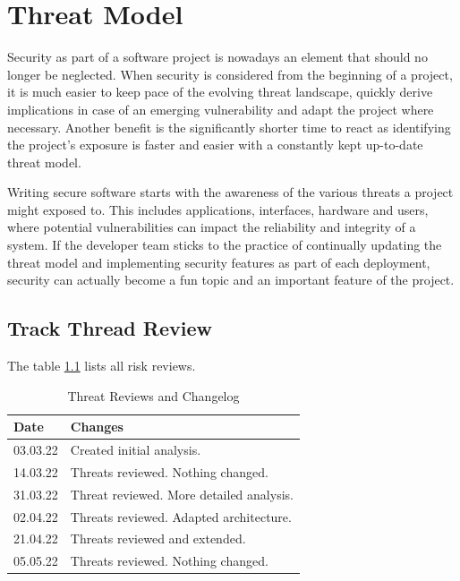 \chapter{Threat Model}

Security as part of a software project is nowadays an element that should no longer be neglected. When security is considered from the beginning of a project, it is much easier to keep pace of the evolving threat landscape, quickly derive implications in case of an emerging vulnerability and adapt the project where necessary. Another benefit is the significantly shorter time to react as identifying the project's exposure is faster and easier with a constantly kept up-to-date threat model.

Writing secure software starts with the awareness of the various threats a project might exposed to. This includes applications, interfaces, hardware and users, where potential vulnerabilities can impact the reliability and integrity of a system. If the developer team sticks to the practice of continually updating the threat model and implementing security features as part of each deployment, security can actually become a fun topic and an important feature of the project.

\section{Track Thread Review}
The table \ref{tab:threat-review} lists all risk reviews.

\begin{table}[h!]
  \centering
  \caption{\label{tab:threat-review}Threat Reviews and Changelog}
  \begin{tabular}{ | l | l | }
    \hline
    \textbf{Date} & \textbf{Changes} \\
    \hline
    03.03.22 & Created initial analysis. \\
    \hline
    14.03.22 & Threats reviewed. Nothing changed. \\
    \hline
    31.03.22 & Threat reviewed. More detailed analysis. \\
    \hline
    02.04.22 & Threats reviewed. Adapted architecture.\\
    \hline
    21.04.22 & Threats reviewed and extended.\\
    \hline
    05.05.22 & Threats reviewed. Nothing changed. \\
    \hline
  \end{tabular}
\end{table}

